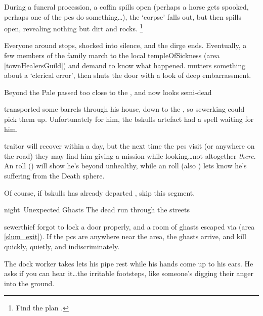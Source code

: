 During a funeral procession, a coffin spills open (perhaps a horse gets spooked, perhaps one of the \glspl{pc} do something\ldots), the `corpse' falls out, but then spills open, revealing nothing but dirt and rocks.%
\footnote{Find the plan .}

Everyone around stops, shocked into silence, and the dirge ends.
Eventually, a few members of the family march to the local \gls{templeOfSickness} (area \vref{townHealersGuild}) and demand to know what happened.
 mutters something about a `clerical error', then shuts the door with a look of deep embarrassment.


  {Beyond the Pale}%
  { passed too close to the , and now looks semi-dead}%

\begin{exampletext}
   transported some barrels through his house, down to the , so \gls{sewerking} could pick them up.
  Unfortunately for him, the \gls{bskulls} \gls{artefact} had a spell waiting for him.
\end{exampletext}

\Gls{traitor} will recover within a day, but the next time the \glspl{pc} visit  (or anywhere on the road) they may find him giving a mission while looking\ldots not altogether \textit{there}.
An  roll (\tn[8]) will show he's beyond unhealthy, while an  roll (also \tn[8]) lets  know he's suffering from the Death \gls{sphere}.

Of course, if \gls{bskulls} has already departed , skip this \gls{segment}.

{\gls{night}~Unexpected Ghasts}%
{The dead run through the streets}%

\Gls{sewerthief} forgot to lock a door properly, and a room of ghasts escaped via  (area \vref{slum_exit}).
If the \glspl{pc} are anywhere near the area, the ghasts arrive, and kill quickly, quietly, and indiscriminately.

\begin{boxtext}
  The dock worker takes lets his pipe rest while his hands come up to his ears.
  He asks if you can hear it\ldots the irritable footsteps, like someone's digging their anger into the ground.
\end{boxtext}

